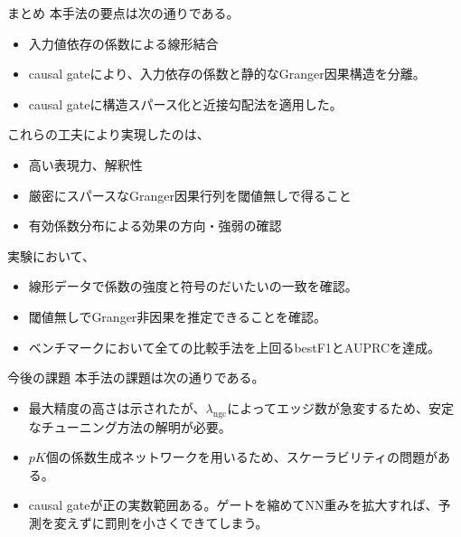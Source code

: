 \documentclass[dvipdfmx,11pt]{beamer}
\begin{document}
\begin{frame}{まとめ}
  \footnotesize
  本手法の要点は次の通りである。

  \begin{itemize}
    \item 入力値依存の係数による線形結合
    \item causal gateにより、入力依存の係数と静的なGranger因果構造を分離。
    \item causal gateに構造スパース化と近接勾配法を適用した。
  \end{itemize}

  \vspace{0.25em}
  これらの工夫により実現したのは、
  \begin{itemize}
    \item 高い表現力、解釈性
    \item 厳密にスパースなGranger因果行列を閾値無しで得ること
    \item 有効係数分布による効果の方向・強弱の確認
  \end{itemize}

  \vspace{0.25em}
  実験において、
  \begin{itemize}
    \item 線形データで係数の強度と符号のだいたいの一致を確認。
    \item 閾値無しでGranger非因果を推定できることを確認。
    \item ベンチマークにおいて全ての比較手法を上回るbestF1とAUPRCを達成。
  \end{itemize}
\end{frame}

\begin{frame}{今後の課題}
  本手法の課題は次の通りである。

  \begin{itemize}
    \item 最大精度の高さは示されたが、$\lambda_{\mathrm{ngc}}$によってエッジ数が急変するため、安定なチューニング方法の解明が必要。
    \item $pK$個の係数生成ネットワークを用いるため、スケーラビリティの問題がある。
    \item causal gateが正の実数範囲ある。ゲートを縮めてNN重みを拡大すれば、予測を変えずに罰則を小さくできてしまう。
  \end{itemize}
\end{frame}
\end{document}
